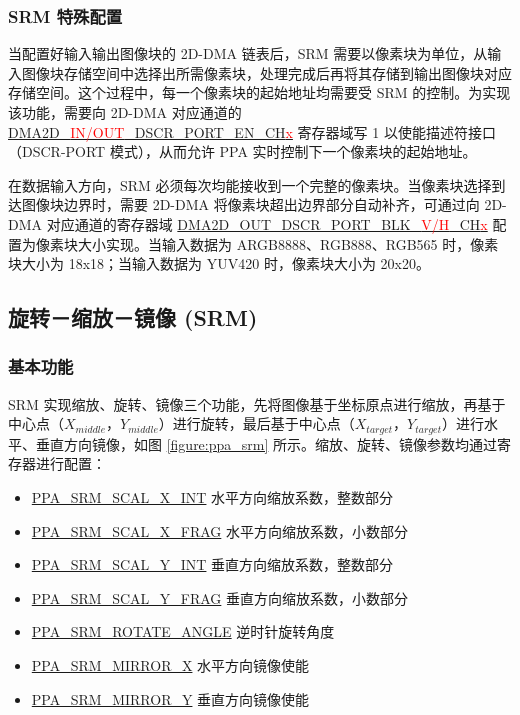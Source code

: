 \documentclass[main\_\_CN.tex]{subfiles}
\begin{document}
\subsubsection{SRM 特殊配置}
当配置好输入输出图像块的 2D-DMA 链表后，SRM 需要以像素块为单位，从输入图像块存储空间中选择出所需像素块，处理完成后再将其存储到输出图像块对应存储空间。这个过程中，每一个像素块的起始地址均需要受 SRM 的控制。为实现该功能，需要向 2D-DMA 对应通道的 \hyperref[fielddesc:DMA2DINDSCRPORTENCHN]{DMA2D\_\textcolor{red}{IN/OUT}\_DSCR\_PORT\_EN\_CH\textcolor{red}{x}} 寄存器域写 1 以使能描述符接口（DSCR-PORT 模式），从而允许 PPA 实时控制下一个像素块的起始地址。

在数据输入方向，SRM 必须每次均能接收到一个完整的像素块。当像素块选择到达图像块边界时，需要 2D-DMA 将像素块超出边界部分自动补齐，可通过向 2D-DMA 对应通道的寄存器域 \hyperref[fielddesc:DMA2DOUTDSCRPORTBLKHCHN]{DMA2D\_OUT\_DSCR\_PORT\_BLK\_\textcolor{red}{V/H}\_CH\textcolor{red}{x}} 配置为像素块大小实现。当输入数据为 ARGB8888、RGB888、RGB565 时，像素块大小为 18x18；当输入数据为 YUV420 时，像素块大小为 20x20。

\subsection{旋转－缩放－镜像 (SRM)}
\subsubsection{基本功能}

SRM 实现缩放、旋转、镜像三个功能，先将图像基于坐标原点进行缩放，再基于中心点（$X_{middle}$，$Y_{middle}$）进行旋转，最后基于中心点（$X_{target}$，$Y_{target}$）进行水平、垂直方向镜像，如图 \ref{figure:ppa_srm} 所示。缩放、旋转、镜像参数均通过寄存器进行配置：
\begin{itemize}
    \item \hyperref[fielddesc:PPASRMSCALXINT]{PPA\_SRM\_SCAL\_X\_INT} 水平方向缩放系数，整数部分
    \item \hyperref[fielddesc:PPASRMSCALXFRAG]{PPA\_SRM\_SCAL\_X\_FRAG} 水平方向缩放系数，小数部分
    \item \hyperref[fielddesc:PPASRMSCALYINT]{PPA\_SRM\_SCAL\_Y\_INT} 垂直方向缩放系数，整数部分
    \item \hyperref[fielddesc:PPASRMSCALYFRAG]{PPA\_SRM\_SCAL\_Y\_FRAG} 垂直方向缩放系数，小数部分
    \item \hyperref[fielddesc:PPASRMROTATEANGLE]{PPA\_SRM\_ROTATE\_ANGLE} 逆时针旋转角度
    \item \hyperref[fielddesc:PPASRMMIRRORX]{PPA\_SRM\_MIRROR\_X} 水平方向镜像使能
    \item \hyperref[fielddesc:PPASRMMIRRORY]{PPA\_SRM\_MIRROR\_Y} 垂直方向镜像使能
\end{itemize}
\end{document}
